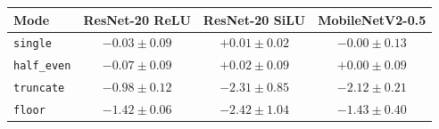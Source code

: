 \setlength{\tabcolsep}{4pt}
\begin{tabular}{lccc}
\toprule
Mode & ResNet-20 ReLU & ResNet-20 SiLU & MobileNetV2-0.5 \\
\midrule
\texttt{single} & $-0.03\pm0.09$ & $+0.01\pm0.02$ & $-0.00\pm0.13$ \\
\texttt{half\_even} & $-0.07\pm0.09$ & $+0.02\pm0.09$ & $+0.00\pm0.09$ \\
\texttt{truncate} & $-0.98\pm0.12$ & $-2.31\pm0.85$ & $-2.12\pm0.21$ \\
\texttt{floor} & $-1.42\pm0.06$ & $-2.42\pm1.04$ & $-1.43\pm0.40$ \\
\bottomrule
\end{tabular}
